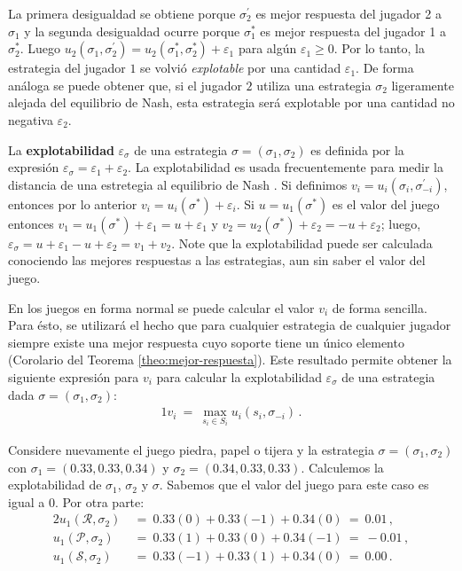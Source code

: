 La primera desigualdad se obtiene porque $\sigma^{\prime}_2$ es mejor respuesta del jugador 2 a $\sigma_1$ y la segunda desigualdad ocurre porque $\sigma^*_1$ es mejor respuesta del jugador 1 a $\sigma^*_2$. Luego $u_2(\sigma_1, \sigma^{\prime}_2) = u_2(\sigma^*_1, \sigma^*_2) + \varepsilon_1$ para algún $\varepsilon_1 \geq 0$. Por lo tanto, la estrategia del jugador $1$ se volvió \textit{explotable} por una cantidad $\varepsilon_1$. De forma análoga se puede obtener que, si el jugador $2$ utiliza una estrategia $\sigma_2$ ligeramente alejada del equilibrio de Nash, esta estrategia será explotable por una cantidad no negativa $\varepsilon_2$.

La \textbf{explotabilidad} $\varepsilon_\sigma$ de una estrategia $\sigma = (\sigma_1, \sigma_2)$ es definida por la expresión $\varepsilon_{\sigma} = \varepsilon_1 + \varepsilon_2$. La explotabilidad es usada frecuentemente para medir la distancia de una estretegia al equilibrio de Nash \cite[p. 7]{bib:thesis-marc-lanctot}. Si definimos $v_i = u_i(\sigma_i, \sigma^{\prime}_{-i})$, entonces por lo anterior $v_i = u_i(\sigma^*) + \varepsilon_i$. Si $u=u_1(\sigma^*)$ es el valor del juego entonces $v_1 = u_1(\sigma^*) + \varepsilon_1 = u + \varepsilon_1$ y $v_2 = u_2(\sigma^*) + \varepsilon_2 = -u + \varepsilon_2$; luego, $\varepsilon_{\sigma} = u + \varepsilon_1 - u + \varepsilon_2 =  v_1 + v_2$. Note que la explotabilidad puede ser calculada conociendo las mejores respuestas a las estrategias, aun sin saber el valor del juego.

En los juegos en forma normal se puede calcular el valor $v_i$ de forma sencilla. Para ésto, se utilizará el hecho que para cualquier estrategia de cualquier jugador siempre existe una mejor respuesta cuyo soporte tiene un único elemento (Corolario del Teorema \ref{theo:mejor-respuesta}). Este resultado permite obtener la siguiente expresión para $v_i$ para calcular la explotabilidad $\varepsilon_\sigma$ de una estrategia dada $\sigma=(\sigma_1,\sigma_2)$:
\begin{alignat}{1}
\label{eq:best-response-fn}
v_i\ =\ \max_{s_{i} \in S_{i}} u_i(s_i, \sigma_{-i}) \,.
\end{alignat}

Considere nuevamente el juego piedra, papel o tijera y la estrategia $\sigma = (\sigma_1, \sigma_2)$ con $\sigma_1 = (0.33, 0.33, 0.34)$ y $\sigma_2 = (0.34, 0.33, 0.33)$. Calculemos la explotabilidad de $\sigma_1$, $\sigma_2$ y $\sigma$. Sabemos que el valor del juego para este caso es igual a $0$. Por otra parte:
\begin{alignat}{2}
u_1(\mathcal{R}, \sigma_2)\ &=\  0.33(0) + 0.33(-1) +  0.34(0)\ =\  0.01 \,, \\
u_1(\mathcal{P}, \sigma_2)\ &=\  0.33(1) +  0.33(0) + 0.34(-1)\ =\ -0.01 \,, \\
u_1(\mathcal{S}, \sigma_2)\ &=\ 0.33(-1) +  0.33(1) +  0.34(0)\ =\  0.00 \,.
\end{alignat}

